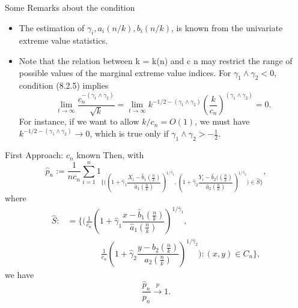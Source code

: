 \documentclass[11pt]{beamer}
\begin{document}
\begin{frame}{Some Remarks about the condition}
\begin{itemize}
\item The estimation of $\gamma_i,a_i(n/k), b_i(n/k)$, is known from the univariate extreme value statistics.
\item Note that the relation between k = k(n) and c n may restrict the range
of possible values of the marginal extreme value indices. For $\gamma_1\land \gamma_2<0, $ condition (8.2.5) implies
\begin{displaymath}
\lim_{t\to \infty} \dfrac{c_n^{-(\gamma_1 \land \gamma_2)}}{\sqrt{k}} =\lim_{t\to \infty} k^{-1/2-(\gamma_1 \land \gamma_2)} (\frac{k}{c_n})^{(\gamma_1 \land \gamma_2)}=0.
\end{displaymath}
For instance, if we want to allow $k/c_n=O(1)$, we must have $k^{-1/2-(\gamma_1 \land \gamma_2)}\to 0$, which is true only if $\gamma_1 \land \gamma_2>-\frac{1}{2}$.
\end{itemize}
\end{frame}


\begin{frame}{First Approach: $c_n$ known}
Then, with
\begin{displaymath}
\hat{p}_n:=\frac{1}{nc_n}\sum_{i=1}^n1_{\big \{    \big(    (1+\hat{\gamma}_1 \dfrac{X_i-\hat{b}_1(\frac{n}{k})}{\hat{a}_1(\frac{n}{k})})^{1/\hat{\gamma}_1}, (1+\hat{\gamma}_2 \dfrac{Y_i-\hat{b}_2((\frac{n}{k})}{\hat{a}_2(\frac{n}{k})})^{1/\hat{\gamma}_2}            \big) \in \hat{S}  \big \}},
\end{displaymath}
where
\begin{displaymath}
\begin{split}
\hat{S}: &=\big \{ \big (\frac{1}{c_n}(1+\hat{\gamma}_1 \dfrac{x-\hat{b}_1(\frac{n}{k})}{\hat{a}_1(\frac{n}{k})})^{1/\hat{\gamma}_1},\\
& \qquad \qquad \frac{1}{c_n}(1+\hat{\gamma}_2 \dfrac{y-\hat{b}_2(\frac{n}{k})}{\hat{a}_2(\frac{n}{k})})^{1/\hat{\gamma}_2}\big ):(x,y)\in C_n \big \},
\end{split}
\end{displaymath}
we have
\begin{displaymath}
\dfrac{\hat{p}_n}{p_n}\stackrel{p}{\to}1.
\end{displaymath}
\end{frame}
\end{document}
